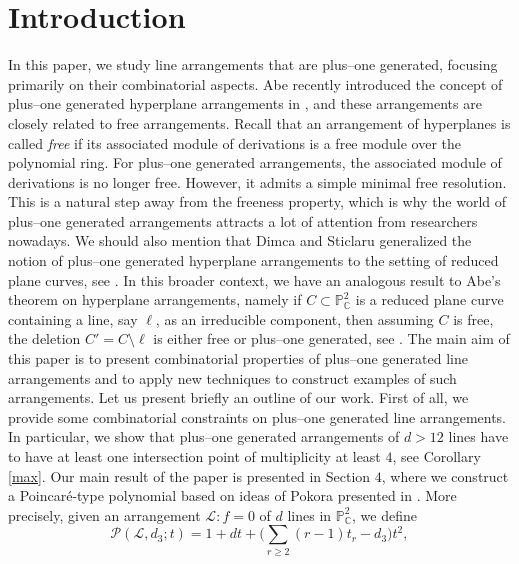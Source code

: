 \documentclass[12pt]{article}
\theoremstyle{plain}
\theoremstyle{definition}
\begin{document}
\section{Introduction}
In this paper, we study line arrangements that are plus--one generated, focusing primarily on their combinatorial aspects. Abe recently introduced the concept of plus--one generated hyperplane arrangements in \cite{Abe18}, and these arrangements are closely related to free arrangements. Recall that an arrangement of hyperplanes is called {\it free} if its associated module of derivations is a free module over the polynomial ring. For plus--one generated arrangements, the associated module of derivations is no longer free. However, it admits a simple minimal free resolution. This is a natural step away from the freeness property, which is why the world of plus--one generated arrangements attracts a lot of attention from researchers nowadays. We should also mention that Dimca and Sticlaru generalized the notion of plus--one generated hyperplane arrangements to the setting of reduced plane curves, see \cite{DS0}. In this broader context, we have an analogous result to Abe's theorem on hyperplane arrangements, namely if $C \subset \mathbb{P}^{2}_{\mathbb{C}}$ is a reduced plane curve containing a line, say $\ell$, as an irreducible component, then assuming $C$ is free, the deletion $C' = C \setminus \ell$ is either free or plus--one generated, see \cite{POG, MP}. The main aim of this paper is to present combinatorial properties of plus--one generated line arrangements and to apply new techniques to construct examples of such arrangements. Let us present briefly an outline of our work. First of all, we provide some combinatorial constraints on plus--one generated line arrangements. In particular, we show that plus--one generated arrangements of $d>12$ lines have to have at least one intersection point of multiplicity at least $4$, see Corollary \ref{max}. Our main result of the paper is presented in Section $4$, where we construct a Poincar\'e-type polynomial based on ideas of Pokora presented in \cite{Pok}. More precisely, given an arrangement $\mathcal{L} : f=0$ of $d$ lines in $\mathbb{P}^{2}_{\mathbb{C}}$, we define
$$\mathcal{P}(\mathcal{L},d_{3};t) = 1 + dt + \bigg( \sum_{r\geq 2}(r-1)t_{r} - d_{3}\bigg)t^{2},$$
\end{document}
